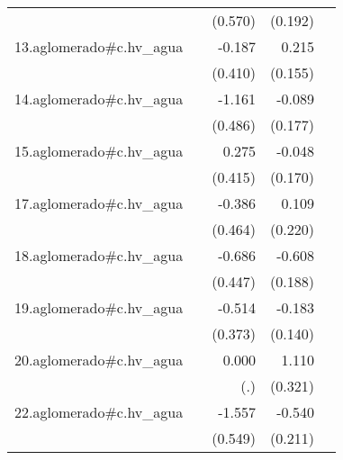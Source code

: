 {\begin{longtable}{l*{4}{D{.}{.}{-1}}}
            &                     &     (0.570)         &     (0.192)         &                     \\
\addlinespace
13.aglomerado#c.hv\_agua&                     &      -0.187         &       0.215         &                     \\
            &                     &     (0.410)         &     (0.155)         &                     \\
\addlinespace
14.aglomerado#c.hv\_agua&                     &      -1.161\sym{*}  &      -0.089         &                     \\
            &                     &     (0.486)         &     (0.177)         &                     \\
\addlinespace
15.aglomerado#c.hv\_agua&                     &       0.275         &      -0.048         &                     \\
            &                     &     (0.415)         &     (0.170)         &                     \\
\addlinespace
17.aglomerado#c.hv\_agua&                     &      -0.386         &       0.109         &                     \\
            &                     &     (0.464)         &     (0.220)         &                     \\
\addlinespace
18.aglomerado#c.hv\_agua&                     &      -0.686         &      -0.608\sym{**} &                     \\
            &                     &     (0.447)         &     (0.188)         &                     \\
\addlinespace
19.aglomerado#c.hv\_agua&                     &      -0.514         &      -0.183         &                     \\
            &                     &     (0.373)         &     (0.140)         &                     \\
\addlinespace
20.aglomerado#c.hv\_agua&                     &       0.000         &       1.110\sym{***}&                     \\
            &                     &         (.)         &     (0.321)         &                     \\
\addlinespace
22.aglomerado#c.hv\_agua&                     &      -1.557\sym{**} &      -0.540\sym{*}  &                     \\
            &                     &     (0.549)         &     (0.211)         &                     \\

\end{longtable}}
